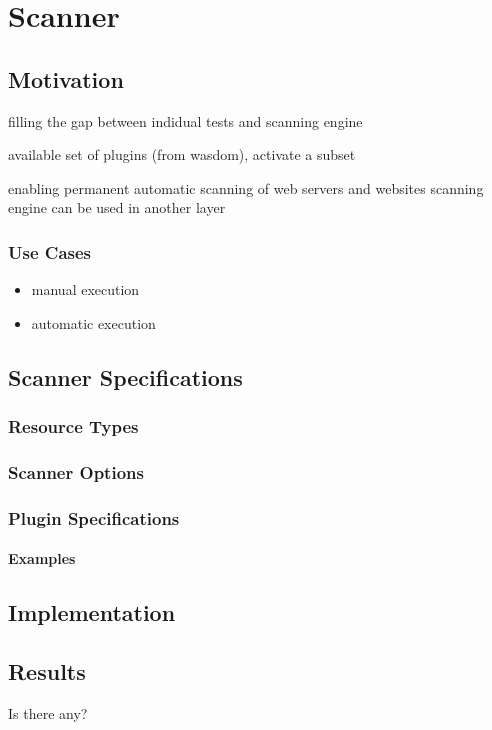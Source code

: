 \chapter{Scanner}
\label{chap4-scanner}
\thispagestyle{empty}

\section{Motivation}
filling the gap between indidual tests and scanning engine

available set of plugins (from wasdom), activate a subset

enabling permanent automatic scanning of web servers and websites
scanning engine can be used in another layer
\subsection{Use Cases}
\begin{itemize}
\item manual execution
\item automatic execution
\end{itemize}

\section{Scanner Specifications}
\subsection{Resource Types}
\subsection{Scanner Options}
\subsection{Plugin Specifications}
\subsubsection{Examples}

\section{Implementation}
\section{Results}
Is there any?



